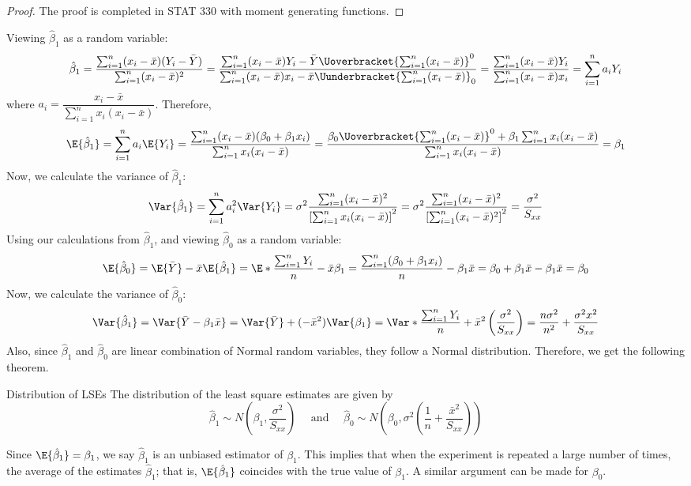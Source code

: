 \begin{proof}
    The proof is completed in STAT 330 with moment generating functions.
\end{proof}
Viewing $ \hat{\beta}_1 $ as a random variable:
\[ \hat{\beta}_1=\frac{\sum_{i=1}^{n} (x_i-\bar{x})
        (Y_i-\bar{Y})}{
        \sum_{i=1}^{n} (x_i-\bar{x})^2
    }
    =
    \frac{\sum_{i=1}^{n} (x_i-\bar{x})Y_i-
        \bar{Y}\Uoverbracket{\sum_{i=1}^{n} (x_i-\bar{x})}^{0}}{
        \sum_{i=1}^{n} (x_i-\bar{x})x_i-\bar{x}
        \Uunderbracket{\sum_{i=1}^{n} (x_i-\bar{x})}_{0}
    }
    =
    \frac{\sum_{i=1}^{n} (x_i-\bar{x})Y_i}{
        \sum_{i=1}^{n} (x_i-\bar{x})x_i
    }=\sum_{i=1}^{n} a_i Y_i  \]
where $ a_i=\dfrac{x_i-\bar{x}}{\sum_{i=1}^{n} x_i(x_i-\bar{x})}  $.
Therefore,
\[
    \E{\hat{\beta}_1}
    = \sum_{i=1}^{n} a_i\E{Y_i}
    =\frac{\sum_{i=1}^{n}(x_i-\bar{x})(\beta_0+\beta_1x_i)}{
        \sum_{i=1}^{n} x_i(x_i-\bar{x})
    }
    =\frac{\beta_0 \Uoverbracket{\sum_{i=1}^{n}(x_i-\bar{x})}^{0}+
        \beta_1\sum_{i=1}^{n} x_i(x_i-\bar{x})}{
        \sum_{i=1}^{n} x_i(x_i-\bar{x})
    }
    =
    \beta_1
\]
Now, we calculate the variance of $ \hat{\beta}_1 $:
\[
    \Var{\hat{\beta}_1}
    =\sum_{i=1}^{n} a_i^2\Var{Y_i}
    =\sigma^2
    \frac{\sum_{i=1}^{n} (x_i-\bar{x})^2}{
        \left[ \sum_{i=1}^{n} x_i(x_i-\bar{x}) \right]^2
    }
    =\sigma^2 \frac{\sum_{i=1}^{n} (x_i-\bar{x})^2}{
        \left[ \sum_{i=1}^{n} (x_i-\bar{x})^2 \right]^2
    }
    =\frac{\sigma^2}{S_{xx}}
\]
Using our calculations from $ \hat{\beta}_1 $,
and viewing $ \hat{\beta}_0 $ as a random variable:
\[ \E{\hat{\beta}_0}=
    \E{\bar{Y}}-\bar{x}\E{\hat{\beta}_1}=
    \E*{\frac{\sum_{i=1}^{n}Y_i}{n}}-\bar{x}\beta_1=
    \frac{\sum_{i=1}^{n}(\beta_0+\beta_1x_i)}{n}-
    \beta_1\bar{x}=\beta_0+\beta_1\bar{x}-\beta_1\bar{x}=\beta_0
\]
Now, we calculate the variance of $ \hat{\beta}_0 $:
\[
    \Var{\hat{\beta}_1}
    =\Var{\bar{Y}-\beta_1\bar{x}}
    =\Var{\bar{Y}}+(-\bar{x}^2)\Var{\beta_1}
    =\Var*{\frac{\sum_{i=1}^{n} Y_i}{n}}+\bar{x}^2\left( \frac{\sigma^2}{S_{xx}} \right)
    =\frac{n\sigma^2}{n^2}+\frac{\sigma^2 x^2}{S_{xx}}
\]
Also, since $ \hat{\beta}_1 $ and $ \hat{\beta}_0 $
are linear combination of Normal random variables,
they follow a Normal distribution. Therefore, we get the following theorem.
\begin{Theorem}{Distribution of LSEs}{}
    The distribution of the least square estimates are given by
    \[ \hat{\beta}_1\sim
        N\left( \beta_1,\frac{\sigma^2}{S_{xx}}  \right)\quad\text{ and }\quad
        \hat{\beta}_0
        \sim N\left( \beta_0,\sigma^2
        \left(\frac{1}{n}+\frac{\bar{x}^2}{S_{xx}}\right)  \right) \]
\end{Theorem}
Since $ \E{\hat{\beta}_1}=\beta_1 $,
we say $ \hat{\beta}_1 $ is an unbiased
estimator of $ \beta_1 $. This implies
that when the experiment is repeated a large
number of times, the average
of the estimates $ \hat{\beta}_1 $; that is,
$ \E{\hat{\beta}_1} $ coincides with the true
value of $ \beta_1 $. A similar argument can be made for $ \beta_0 $.

